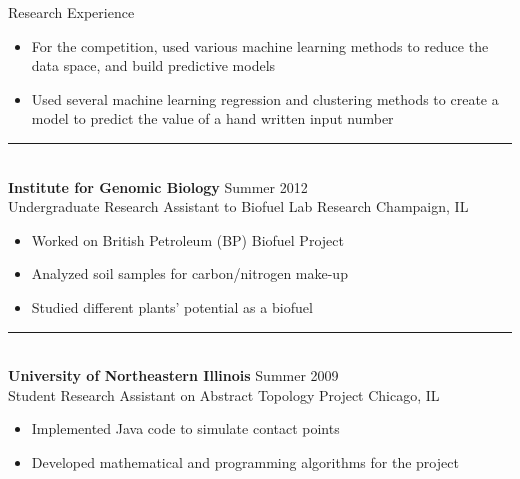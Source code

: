 \documentclass[9pt]{resume} %
\begin{document}
\begin{rSection}{Research Experience}
\begin{itemize}
		\item For the competition, used various machine learning methods to reduce the data space, and build predictive models
		\item Used several machine learning regression and clustering methods to create a model to predict the value of a hand written input number
	\end{itemize}
	{\centering\noindent\rule{5cm}{0.4pt}}
	\\
	{\bf Institute for Genomic Biology} \hfill {Summer 2012}\\
	Undergraduate Research Assistant to Biofuel Lab Research \hfill {Champaign, IL}
	\begin{itemize}\setlength\itemsep{-3pt}
		\item Worked on British Petroleum (BP) Biofuel Project
		\item Analyzed soil samples for carbon/nitrogen make-up
		\item Studied different plants' potential as a biofuel
	\end{itemize}
	{\centering\noindent\rule{5cm}{0.4pt}}
	\\
	{\bf University of Northeastern Illinois} \hfill {Summer 2009}\\
	Student Research Assistant on Abstract Topology Project \hfill {Chicago, IL}
	\begin{itemize}\setlength\itemsep{-3pt}
		\item Implemented Java code to simulate contact points
		\item Developed mathematical and programming algorithms for the project
	\end{itemize}
	
\end{rSection}
\end{document}
